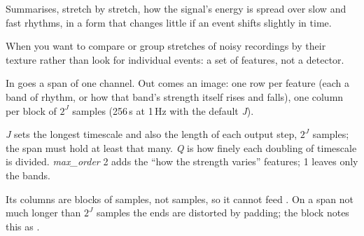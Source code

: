 Summarises, stretch by stretch, how the signal's energy is spread over slow and fast rhythms,
in a form that changes little if an event shifts slightly in time.

When you want to compare or group stretches of noisy recordings by their texture rather than
look for individual events: a set of features, not a detector.

In goes a span of one channel. Out comes an image: one row per feature (each a band of rhythm,
or how that band's strength itself rises and falls), one column per block of $2^J$ samples
(256\,s at 1\,Hz with the default \emph{J}).

\emph{J} sets the longest timescale and also the length of each output step, $2^J$ samples;
the span must hold at least that many. \emph{Q} is how finely each doubling of timescale is
divided. \emph{max\_order} 2 adds the ``how the strength varies'' features; 1 leaves only the
bands.

Its columns are blocks of samples, not samples, so it cannot feed
. On a span not much longer than $2^J$ samples the ends
are distorted by padding; the block notes this as .
